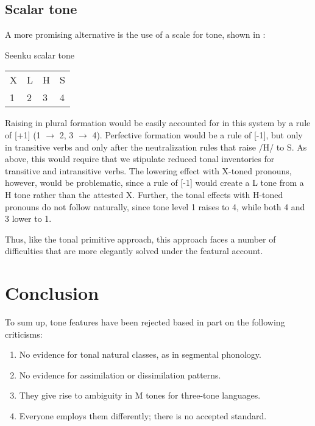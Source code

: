\documentclass[output=paper]{langsci/langscibook}
\begin{document}
\subsection{Scalar tone}\label{sec:mcpherson:5.2}

A more promising alternative is the use of a scale for tone, shown in :

\ea\label{ex:mcpherson:26} Seenku scalar tone \\
\begin{tabular}[t]{llll}
  X &  L & H & S \\
  1 & 2 & 3 & 4 \\
\end{tabular}
\z

Raising in plural formation would be easily accounted for in this system by a rule of [+1] (1 $\rightarrow$ 2, 3 $\rightarrow$ 4). Perfective formation would be a rule of [-1], but only in transitive verbs and only after the neutralization rules that raise /H/ to S. As above, this would require that we stipulate reduced tonal inventories for transitive and intransitive verbs. The lowering effect with X-toned pronouns, however, would be problematic, since a rule of [-1] would create a L tone from a H tone rather than the attested X. Further, the tonal effects with H-toned pronouns do not follow naturally, since tone level 1 raises to 4, while both 4 and 3 lower to 1.

Thus, like the tonal primitive approach, this approach faces a number of difficulties that are more elegantly solved under the featural account.


\section{Conclusion}\label{sec:mcpherson:SecConclusion}

To sum up, tone features have been rejected based in part on the following criticisms:

\begin{enumerate}
  \item No evidence for tonal natural classes, as in segmental phonology. 
  \item No evidence for assimilation or dissimilation patterns.
  \item They give rise to ambiguity in M tones for three-tone languages.
  \item Everyone employs them differently; there is no accepted standard.
\end{enumerate}
\end{document}
